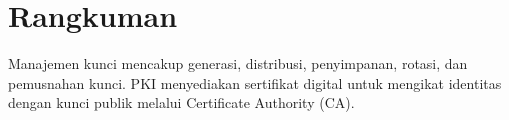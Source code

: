 \section*{Rangkuman}
Manajemen kunci mencakup generasi, distribusi, penyimpanan, rotasi, dan pemusnahan kunci. PKI menyediakan sertifikat digital untuk mengikat identitas dengan kunci publik melalui Certificate Authority (CA).
